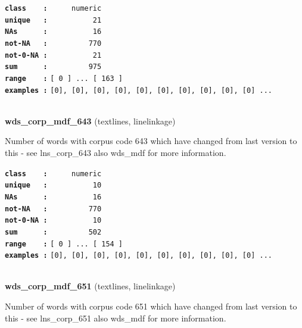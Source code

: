 \documentclass[]{article}
\begin{document}
\textbf{\texttt{class\ \ \ \ :}} \texttt{~~~~~numeric}\\
\textbf{\texttt{unique\ \ \ :}} \texttt{~~~~~~~~~~21}\\
\textbf{\texttt{NAs\ \ \ \ \ \ :}} \texttt{~~~~~~~~~~16}\\
\textbf{\texttt{not-NA\ \ \ :}} \texttt{~~~~~~~~~770}\\
\textbf{\texttt{not-0-NA\ :}} \texttt{~~~~~~~~~~21}\\
\textbf{\texttt{sum\ \ \ \ \ \ :}} \texttt{~~~~~~~~~975}\\
\textbf{\texttt{range\ \ \ \ :}}
\texttt{{[}\ 0\ {]}\ ...\ {[}\ 163\ {]}}\\
\textbf{\texttt{examples\ :}}
\texttt{{[}0{]},\ {[}0{]},\ {[}0{]},\ {[}0{]},\ {[}0{]},\ {[}0{]},\ {[}0{]},\ {[}0{]},\ {[}0{]},\ {[}0{]}\ ...}\\

~

\textbf{wds\_corp\_mdf\_643} (textlines, linelinkage)

Number of words with corpus code 643 which have changed from last
version to this - see lns\_corp\_643 also wds\_mdf for more information.

\textbf{\texttt{class\ \ \ \ :}} \texttt{~~~~~numeric}\\
\textbf{\texttt{unique\ \ \ :}} \texttt{~~~~~~~~~~10}\\
\textbf{\texttt{NAs\ \ \ \ \ \ :}} \texttt{~~~~~~~~~~16}\\
\textbf{\texttt{not-NA\ \ \ :}} \texttt{~~~~~~~~~770}\\
\textbf{\texttt{not-0-NA\ :}} \texttt{~~~~~~~~~~10}\\
\textbf{\texttt{sum\ \ \ \ \ \ :}} \texttt{~~~~~~~~~502}\\
\textbf{\texttt{range\ \ \ \ :}}
\texttt{{[}\ 0\ {]}\ ...\ {[}\ 154\ {]}}\\
\textbf{\texttt{examples\ :}}
\texttt{{[}0{]},\ {[}0{]},\ {[}0{]},\ {[}0{]},\ {[}0{]},\ {[}0{]},\ {[}0{]},\ {[}0{]},\ {[}0{]},\ {[}0{]}\ ...}\\

~

\textbf{wds\_corp\_mdf\_651} (textlines, linelinkage)

Number of words with corpus code 651 which have changed from last
version to this - see lns\_corp\_651 also wds\_mdf for more information.
\end{document}

